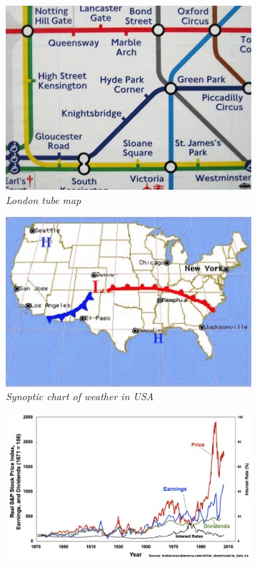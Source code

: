 \begin{figure}[!htb]
\centering

\begin{subfigure}{.5\textwidth}
  \centering
  \includegraphics[scale=.50]{tubemap.jpg}
  \caption{\emph{London tube map}}
\end{subfigure}%
\begin{subfigure}{.5\textwidth}
  \centering
  \includegraphics[scale=.25]{weather.png}
  \caption{\emph{Synoptic chart of weather in USA} }
\end{subfigure}
\begin{subfigure}{.5\textwidth}
  \centering
  \includegraphics[scale=.25]{stockmarket.png}

\end{subfigure}
\end{figure}
